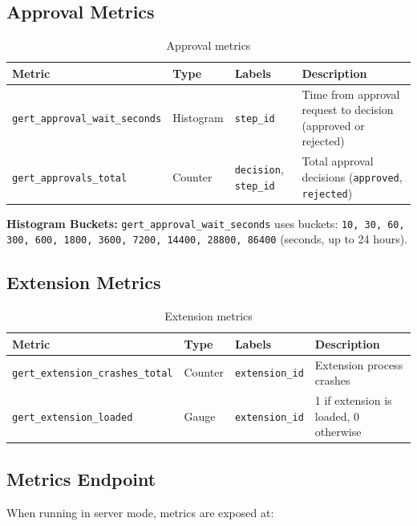 \subsection{Approval Metrics}

\begin{table}[h]
\centering
\begin{tabular}{|p{4.5cm}|p{1.5cm}|p{3.5cm}|p{5.5cm}|}
\hline
\textbf{Metric} & \textbf{Type} & \textbf{Labels} & \textbf{Description} \\
\hline
\texttt{gert\_approval\_wait\_seconds} & Histogram & \texttt{step\_id} & Time from approval request to decision (approved or rejected) \\
\hline
\texttt{gert\_approvals\_total} & Counter & \texttt{decision}, \texttt{step\_id} & Total approval decisions (\texttt{approved}, \texttt{rejected}) \\
\hline
\end{tabular}
\caption{Approval metrics}
\end{table}

\textbf{Histogram Buckets:} \texttt{gert\_approval\_wait\_seconds} uses buckets: \texttt{10, 30, 60, 300, 600, 1800, 3600, 7200, 14400, 28800, 86400} (seconds, up to 24 hours).

\subsection{Extension Metrics}

\begin{table}[h]
\centering
\begin{tabular}{|p{4.5cm}|p{1.5cm}|p{3.5cm}|p{5.5cm}|}
\hline
\textbf{Metric} & \textbf{Type} & \textbf{Labels} & \textbf{Description} \\
\hline
\texttt{gert\_extension\_crashes\_total} & Counter & \texttt{extension\_id} & Extension process crashes \\
\hline
\texttt{gert\_extension\_loaded} & Gauge & \texttt{extension\_id} & 1 if extension is loaded, 0 otherwise \\
\hline
\end{tabular}
\caption{Extension metrics}
\end{table}

\subsection{Metrics Endpoint}

When running in server mode, metrics are exposed at:

